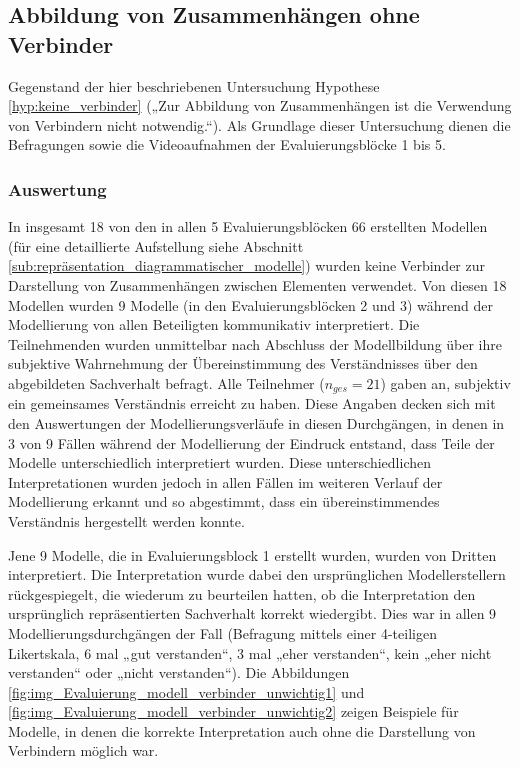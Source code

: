 
\subsection{Abbildung von Zusammenhängen ohne Verbinder} %
\label{sub:abbildung_von_zusammenhängen_ohne_verbinder}

Gegenstand der hier beschriebenen Untersuchung Hypothese \ref{hyp:keine_verbinder} („Zur Abbildung von Zusammenhängen ist die Verwendung von Verbindern nicht notwendig.“). Als Grundlage dieser Untersuchung dienen die Befragungen sowie die Videoaufnahmen der Evaluierungsblöcke 1 bis 5.

\subsubsection{Auswertung} %

In insgesamt 18 von den in allen 5 Evaluierungsblöcken 66 erstellten Modellen (für eine detaillierte Aufstellung siehe Abschnitt \ref{sub:repräsentation_diagrammatischer_modelle}) wurden keine Verbinder zur Darstellung von Zusammenhängen zwischen Elementen verwendet. Von diesen 18 Modellen wurden 9 Modelle (in den Evaluierungsblöcken 2 und 3) während der Modellierung von allen Beteiligten kommunikativ interpretiert. Die Teilnehmenden wurden unmittelbar nach Abschluss der Modellbildung über ihre subjektive Wahrnehmung der Übereinstimmung des Verständnisses über den abgebildeten Sachverhalt befragt. Alle Teilnehmer ($n_{ges}=21$) gaben an, subjektiv ein gemeinsames Verständnis erreicht zu haben. Diese Angaben decken sich mit den Auswertungen der Modellierungsverläufe in diesen Durchgängen, in denen in 3 von 9 Fällen während der Modellierung der Eindruck entstand, dass Teile der Modelle unterschiedlich interpretiert wurden. Diese unterschiedlichen Interpretationen wurden jedoch in allen Fällen im weiteren Verlauf der Modellierung erkannt und so abgestimmt, dass ein übereinstimmendes Verständnis hergestellt werden konnte.

Jene 9 Modelle, die in Evaluierungsblock 1 erstellt wurden, wurden von Dritten interpretiert. Die Interpretation wurde dabei den ursprünglichen Modellerstellern rückgespiegelt, die wiederum zu beurteilen hatten, ob die Interpretation den ursprünglich repräsentierten Sachverhalt korrekt wiedergibt. Dies war in allen 9 Modellierungsdurchgängen der Fall (Befragung mittels einer 4-teiligen Likertskala, 6 mal „gut verstanden“, 3 mal „eher verstanden“, kein „eher nicht verstanden“ oder „nicht verstanden“). Die Abbildungen  \ref{fig:img_Evaluierung_modell_verbinder_unwichtig1} und \ref{fig:img_Evaluierung_modell_verbinder_unwichtig2} zeigen Beispiele für Modelle, in denen die korrekte Interpretation auch ohne die Darstellung von Verbindern möglich war.

